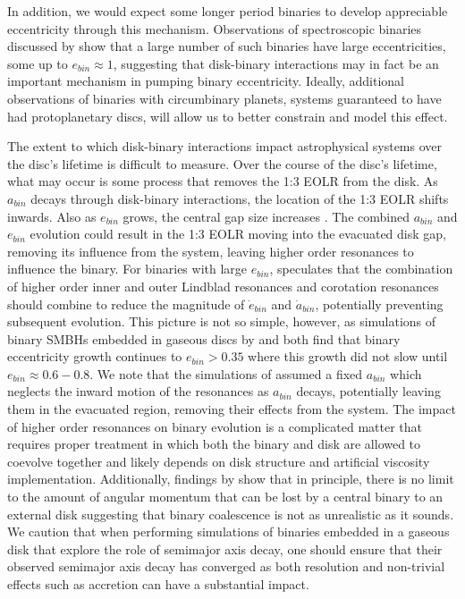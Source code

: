 In addition, we would expect some longer period binaries to develop appreciable eccentricity through this mechanism.  Observations of spectroscopic binaries discussed by \citet{Mazeh08} show that a large number of such binaries have large eccentricities, some up to $e_{bin} \approx 1$, suggesting that disk-binary interactions may in fact be an important mechanism in pumping binary eccentricity.  Ideally, additional observations of binaries with circumbinary planets, systems guaranteed to have had protoplanetary discs, will allow us to better constrain and model this effect.

The extent to which disk-binary interactions impact astrophysical systems over the disc's lifetime is difficult to measure.  Over the course of the disc's 
lifetime, what may occur is some process that removes the 1:3 EOLR from the disk.  As $a_{bin}$ decays through disk-binary interactions, the location of the 
1:3 EOLR shifts inwards.  Also as $e_{bin}$ grows, the central gap size increases \citep{Arty94}.  The combined $a_{bin}$ and $e_{bin}$ evolution could result 
in the 1:3 EOLR moving into the evacuated disk gap, removing its influence from the system, leaving higher order resonances to influence the binary.  For 
binaries with large $e_{bin}$, \citet{Artymowicz1991} speculates that the combination of higher order inner and outer Lindblad resonances and corotation resonances 
should combine to reduce the magnitude of $\dot{e}_{bin}$ and $\dot{a}_{bin}$, potentially preventing subsequent evolution.  This picture is not so 
simple, however, as simulations of binary SMBHs embedded in gaseous discs by \citet{Cuadra2009} and \citet{Roedig11} both find that binary eccentricity growth 
continues to $e_{bin} > 0.35$ where this growth did not slow until $e_{bin} \approx 0.6-0.8$.  We note that the simulations of \citet{Roedig11} assumed a fixed 
$a_{bin}$ which neglects the inward motion of the resonances as $a_{bin}$ decays, potentially leaving them in the evacuated region, removing their effects 
from the system.  The impact of higher order resonances on binary evolution is a complicated matter that requires proper treatment in which both the binary and 
disk are allowed to coevolve together and likely depends on disk structure and artificial viscosity implementation.  Additionally, findings by \citet{Pringle91} show 
that in principle, there is no limit to the amount of angular momentum that can be lost by a central binary to an external disk suggesting that binary coalescence 
is not as unrealistic as it sounds.   We caution that when performing simulations of binaries embedded in a gaseous disk that explore the role of semimajor axis decay, one should ensure that their observed semimajor axis decay has converged as both resolution and non-trivial effects such as accretion \citep[e.g.][]{Roedig12} can have a substantial impact.

